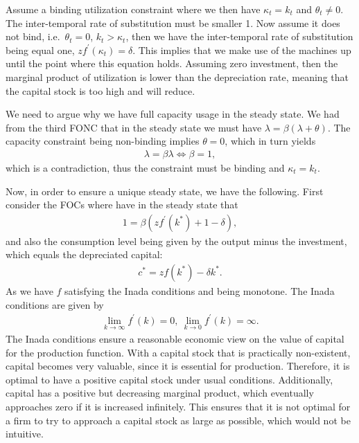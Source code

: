 \documentclass[a4paper]{article}
\theoremstyle{definition}
\begin{document}
Assume a binding utilization constraint where we then have $\kappa_t = k_t$ and $\theta_t \neq 0$. The inter-temporal rate of substitution must be smaller 1. Now assume it does not bind, i.e.\ $\theta_t = 0$, $k_t > \kappa_t$, then we have the inter-temporal rate of substitution being equal one, $z f^\prime (\kappa_t) = \delta$. This implies that we make use of the machines up until the point where this equation holds. Assuming zero investment, then the marginal product of utilization is lower than the depreciation rate, meaning that the capital stock is too high and will reduce.

We need to argue why we have full capacity usage in the steady state. We had from the third FONC that in the steady state we must have $\lambda = \beta (\lambda+\theta)$. The capacity constraint being non-binding implies $\theta = 0$, which in turn yields
	\begin{align*}
	\lambda = \beta \lambda \Leftrightarrow \beta = 1,
	\end{align*}
which is a contradiction, thus the constraint must be binding and $\kappa_t = k_t$. 	

Now, in order to ensure a unique steady state, we have the following. First consider the FOCs where have in the steady state that
	\begin{align*}
	1 = \beta (z f^\prime(k^*)+1-\delta),
	\end{align*}
and also the consumption level being given by the output minus the investment, which equals the depreciated capital:
	\begin{align*}
	c^* = z f(k^*) - \delta k^*.
	\end{align*}	
As we have $f$ satisfying the Inada conditions and being monotone. The Inada conditions are given by
	\begin{align*}
	\lim\limits_{k\rightarrow\infty}f^\prime(k)=0,\ \lim\limits_{k\rightarrow0} f^\prime(k) = \infty.
	\end{align*}
The Inada conditions ensure a reasonable economic view on the value of capital for the production function. With a capital stock that is practically non-existent, capital becomes very valuable, since it is essential for production. Therefore, it is optimal to have a positive capital stock under usual conditions. Additionally, capital has a positive but decreasing marginal product, which eventually approaches zero if it is increased infinitely. This ensures that it is not optimal for a firm to try to approach a capital stock as large as possible, which would not be intuitive.
\end{document}

